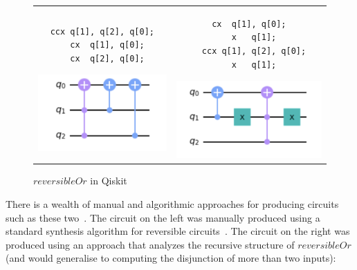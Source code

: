 \begin{figure}
  \begin{tabular}{c@{\qquad}c}
    \begin{minipage}[t]{0.45\linewidth}
      \begin{Verbatim}[fontsize=\small]
  ccx q[1], q[2], q[0];
  cx  q[1], q[0];
  cx  q[2], q[0];
  \end{Verbatim}
      \includegraphics[scale=0.5]{reversibleOr.png}
    \end{minipage}
     &
    \begin{minipage}[t]{0.45\linewidth}
      \begin{Verbatim}[fontsize=\small]
  cx  q[1], q[0];
  x   q[1];
  ccx q[1], q[2], q[0];
  x   q[1];
  \end{Verbatim}
      \includegraphics[scale=0.45]{reversibleOr2.png}
    \end{minipage}
  \end{tabular}
  \caption{$\mathit{reversibleOr}$ in Qiskit}
  \label{fig:qiskit}
\end{figure}

There is a wealth of manual and algorithmic approaches for producing circuits such as these
two~\cite{maslov:2003:rls:1087512,1201583}. The circuit on the left was manually produced using a standard synthesis
algorithm for reversible circuits~\cite{10.1145/775832.775915}. The circuit on the right was produced using an approach
that analyzes the recursive structure of $\mathit{reversibleOr}$ (and would generalise to computing the disjunction of
more than two inputs):

